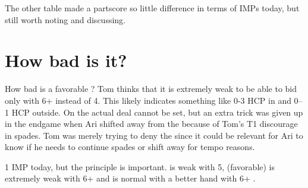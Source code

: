 \documentclass[tom-ari]{subfile}
\begin{document}
The other table made a partscore so little difference in terms of IMPs today, but still worth noting and discussing.

\section{How bad is it?}

\begin{handdiagram}
\end{handdiagram}


How bad is a favorable ?  Tom thinks that it is extremely weak to be able to bid only  with 6+ instead of 4.  This likely indicates something like 0-3 HCP in \sss and 0--1 HCP outside.  On the actual deal  cannot be set, but an extra trick was given up in the endgame when Ari shifted away from the  because of Tom's T1 discourage in spades.  Tom was merely trying to deny the  since it could be relevant for Ari to know if he needs to continue spades or shift away for tempo reasons.

1 IMP today, but the principle is important.   is weak with 5,  (favorable) is extremely weak with 6+ and  is normal with a better hand with 6+ \sss.
	
\end{document}
